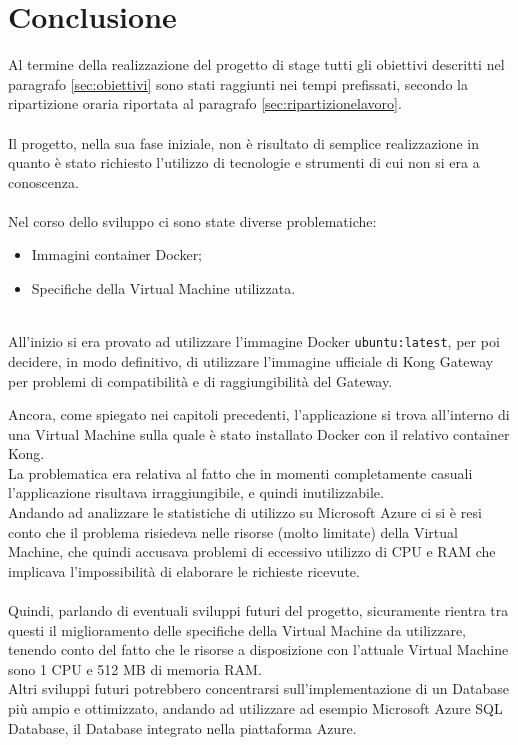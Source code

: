 \chapter*{Conclusione} %
Al termine della realizzazione del progetto di stage tutti gli obiettivi descritti nel paragrafo \ref{sec:obiettivi} sono stati raggiunti nei tempi prefissati, 
secondo la ripartizione oraria riportata al paragrafo \ref{sec:ripartizionelavoro}.\\ \\

Il progetto, nella sua fase iniziale, non è risultato di semplice realizzazione in quanto è stato richiesto l'utilizzo di tecnologie e strumenti di cui non si era a conoscenza.\\ \\

Nel corso dello sviluppo ci sono state diverse problematiche:
\begin{itemize}
\item Immagini container Docker;
\item Specifiche della Virtual Machine utilizzata.
\end{itemize}
\  \\
All'inizio si era provato ad utilizzare l'immagine Docker \texttt{ubuntu:latest}, per poi decidere, in modo definitivo, di utilizzare l'immagine ufficiale di Kong Gateway 
per problemi di compatibilità e di raggiungibilità del Gateway.

Ancora, come spiegato nei capitoli precedenti, l'applicazione si trova all'interno di una Virtual Machine sulla quale è stato installato Docker con il relativo container Kong.\\
La problematica era relativa al fatto che in momenti completamente casuali l'applicazione risultava irraggiungibile, e quindi inutilizzabile.\\ 
Andando ad analizzare le statistiche di utilizzo su Microsoft Azure ci si è resi conto che il problema risiedeva nelle risorse (molto limitate) della Virtual Machine, 
che quindi accusava problemi di eccessivo utilizzo di CPU e RAM che implicava l'impossibilità di elaborare le richieste ricevute.\\ \\ 

Quindi, parlando di eventuali sviluppi futuri del progetto, sicuramente rientra tra questi il miglioramento delle specifiche della Virtual Machine da utilizzare, 
tenendo conto del fatto che le risorse a disposizione con l'attuale Virtual Machine sono 1 CPU e 512 MB di memoria RAM.\\
Altri sviluppi futuri potrebbero concentrarsi sull'implementazione di un Database più ampio e ottimizzato, andando ad utilizzare ad esempio Microsoft Azure SQL Database, 
il Database integrato nella piattaforma Azure.
